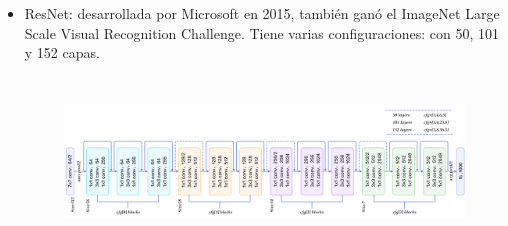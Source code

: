 \documentclass[a4paper,10pt]{article}
\begin{document}
\begin{itemize}
\begin{figure}[H]
\end{figure} 	
\item ResNet: desarrollada por Microsoft en 2015, también ganó el ImageNet Large Scale Visual Recognition Challenge. Tiene varias configuraciones: con 50, 101 y 152 capas.\begin{figure}[H]
\centering
\includegraphics[width=12.0cm, height=4.5cm]{resnet.png}
\end{figure} 	

\end{itemize}
\end{document}
